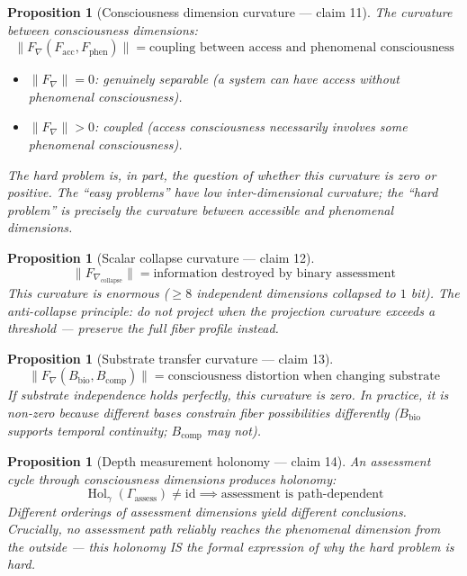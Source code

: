 \documentclass[11pt,a4paper]{article}
\newtheorem{proposition}[definition]{Proposition}
\begin{document}
\begin{proposition}[Consciousness dimension curvature --- claim 11]
\label{prop:coupling}
The curvature between consciousness dimensions:
\[
  \|F_\nabla(F_{\text{acc}}, F_{\text{phen}})\| = \text{coupling between
    access and phenomenal consciousness}
\]
\begin{itemize}
  \item $\|F_\nabla\| = 0$: genuinely separable (a system can have access
    without phenomenal consciousness).
  \item $\|F_\nabla\| > 0$: coupled (access consciousness necessarily
    involves some phenomenal consciousness).
\end{itemize}
The hard problem is, in part, the question of whether this curvature
is zero or positive. The ``easy problems'' have low inter-dimensional
curvature; the ``hard problem'' is precisely the curvature between
accessible and phenomenal dimensions.
\end{proposition}

\begin{proposition}[Scalar collapse curvature --- claim 12]
\label{prop:collapse_curv}
\[
  \|F_{\nabla_{\text{collapse}}}\| = \text{information destroyed by
    binary assessment}
\]
This curvature is enormous ($\geq 8$ independent dimensions collapsed
to $1$ bit). The anti-collapse principle: do not project when the
projection curvature exceeds a threshold --- preserve the full fiber
profile instead.
\end{proposition}

\begin{proposition}[Substrate transfer curvature --- claim 13]
\label{prop:transfer}
\[
  \|F_\nabla(B_{\text{bio}}, B_{\text{comp}})\| = \text{consciousness
    distortion when changing substrate}
\]
If substrate independence holds perfectly, this curvature is zero.
In practice, it is non-zero because different bases constrain fiber
possibilities differently ($B_{\text{bio}}$ supports temporal
continuity; $B_{\text{comp}}$ may not).
\end{proposition}

\begin{proposition}[Depth measurement holonomy --- claim 14]
\label{prop:holonomy}
An assessment cycle through consciousness dimensions produces holonomy:
\[
  \operatorname{Hol}_\gamma(\Gamma_{\text{assess}}) \neq \mathrm{id}
  \implies \text{assessment is path-dependent}
\]
Different orderings of assessment dimensions yield different conclusions.
Crucially, no assessment path reliably reaches the phenomenal dimension
from the outside --- this holonomy IS the formal expression of why the
hard problem is hard.
\end{proposition}
\end{document}
